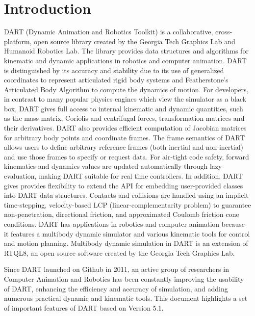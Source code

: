 \section{Introduction}

DART (Dynamic Animation and Robotics Toolkit) is a collaborative, cross-platform, open source library created by the Georgia Tech Graphics Lab and Humanoid Robotics Lab. The library provides data structures and algorithms for kinematic and dynamic applications in robotics and computer animation. DART is distinguished by its accuracy and stability due to its use of generalized coordinates to represent articulated rigid body systems and Featherstone's Articulated Body Algorithm to compute the dynamics of motion. For developers, in contrast to many popular physics engines which view the simulator as a black box, DART gives full access to internal kinematic and dynamic quantities, such as the mass matrix, Coriolis and centrifugal forces, transformation matrices and their derivatives. DART also provides efficient computation of Jacobian matrices for arbitrary body points and coordinate frames. The frame semantics of DART allows users to define arbitrary reference frames (both inertial and non-inertial) and use those frames to specify or request data. For air-tight code safety, forward kinematics and dynamics values are updated automatically through lazy evaluation, making DART suitable for real time controllers. In addition, DART gives provides flexibility to extend the API for embedding user-provided classes into DART data structures. Contacts and collisions are handled using an implicit time-stepping, velocity-based LCP (linear-complementarity problem) to guarantee non-penetration, directional friction, and approximated Coulomb friction cone conditions. DART has applications in robotics and computer animation because it features a multibody dynamic simulator and various kinematic tools for control and motion planning. Multibody dynamic simulation in DART is an extension of RTQL8, an open source software created by the Georgia Tech Graphics Lab.

Since DART launched on Github in 2011, an active group of researchers in Computer Animation and Robotics has been constantly improving the usability of DART, enhancing the efficiency and accuracy of simulation, and adding numerous practical dynamic and kinematic tools. This document highlights a set of important features of DART based on Version 5.1.

